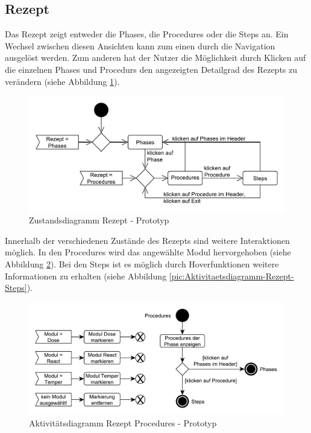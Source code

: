 \subsection{Rezept}
Das Rezept zeigt entweder die Phases, die Procedures oder die Steps an. Ein Wechsel zwischen diesen Ansichten kann zum einen durch die Navigation ausgelöst werden. Zum anderen hat der Nutzer die Möglichkeit durch Klicken auf die einzelnen Phases und Procedurs den angezeigten Detailgrad des Rezepts zu verändern (siehe Abbildung \ref{pic:Zustandsdiagramm-Rezept}).
\begin{figure}[htbp]
\centering
\includegraphics[scale=0.58]{DA_files/UML/Prototyp/Zustandsdiagramm-Rezept.pdf}
\caption{Zustandsdiagramm Rezept - Prototyp}
\label{pic:Zustandsdiagramm-Rezept}
\end{figure}
Innerhalb der verschiedenen Zustände des Rezepts sind weitere Interaktionen möglich. In den Procedures wird das angewählte Modul hervorgehoben (siehe Abbildung \ref{pic:Aktivitaetsdiagramm-Rezept-Procedures}). Bei den Steps ist es möglich durch Hoverfunktionen weitere Informationen zu erhalten (siehe Abbildung \ref{pic:Aktivitaetsdiagramm-Rezept-Steps}).
\begin{figure}[htbp]
\centering
\includegraphics[scale=0.48]{DA_files/UML/Prototyp/Aktivitaetsdiagramm-Rezept-Procedures.pdf}
\caption{Aktivitätsdiagramm Rezept Procedures - Prototyp}
\label{pic:Aktivitaetsdiagramm-Rezept-Procedures}
\end{figure}


